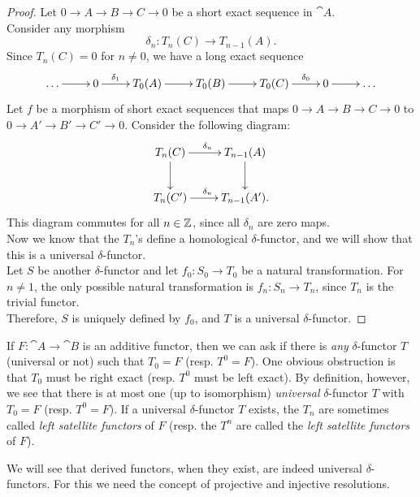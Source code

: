 \begin{proof}
	Let $0 \rightarrow A \rightarrow B \rightarrow C \rightarrow 0$ be a short exact sequence in $\cat{A}$. \\
	Consider any morphism $$\delta_n:T_n(C)\rightarrow T_{n-1}(A).$$
	Since $T_n(C)=0$ for $n\neq0$, we have a long exact sequence
	\[
		\xymatrix{
			\dots \ar[r] &0 \ar[r]^-{\delta_1} &T_0(A) \ar[r] &T_0(B) \ar[r] &T_0(C) \ar[r]^-{\delta_0} &0 \ar[r] &\dots
		}
	\]
	Let $f$ be a morphism of short exact sequences that maps $0 \rightarrow A \rightarrow B \rightarrow C \rightarrow 0$ to $0 \rightarrow A' \rightarrow B' \rightarrow C' \rightarrow 0$. Consider the following diagram:
	\[
		\xymatrix{
			T_n(C) \ar[r]^{\delta_n} \ar[d] &T_{n-1}(A) \ar[d] \\
			T_n(C') \ar[r]^{\delta_n} &T_{n-1}(A').
		}
	\]
	This diagram commutes for all $n\in{\mathbb Z}$, since all $\delta_n$ are zero maps. \\
	Now we know that the $T_n$'s define a homological $\delta$-functor, and we will show that this is a universal $\delta$-functor. \\
	Let $S$ be another $\delta$-functor and let $f_0:S_0\rightarrow T_0$ be a natural transformation.
	For $n\neq1$, the only possible natural transformation is $f_n:S_n\rightarrow T_n$, since $T_n$ is the trivial functor. \\
	Therefore, $S$ is uniquely defined by $f_0$, and $T$ is a universal $\delta$-functor.
\end{proof}

\begin{remark}
	If $F:\cat{A}\rightarrow\cat{B}$ is an additive functor, then we can ask if there is \textit{any} $\delta$-functor $T$ (universal or not) such that $T_0=F$ (resp. $T^0=F$).
	One obvious obstruction is that $T_0$ must be right exact (resp. $T^0$ must be left exact).
	By definition, however, we see that there is at most one (up to isomorphism) \textit{universal} $\delta$-functor $T$ with $T_0=F$ (resp. $T^0=F$).
	If a universal $\delta$-functor $T$ exists, the $T_n$ are sometimes called \textit{left satellite functors} of $F$ (resp. the $T^n$ are called the \textit{left satellite functors} of $F$).
	
	We will see that derived functors, when they exist, are indeed universal $\delta$-functors.
	For this we need the concept of projective and injective resolutions.
\end{remark}